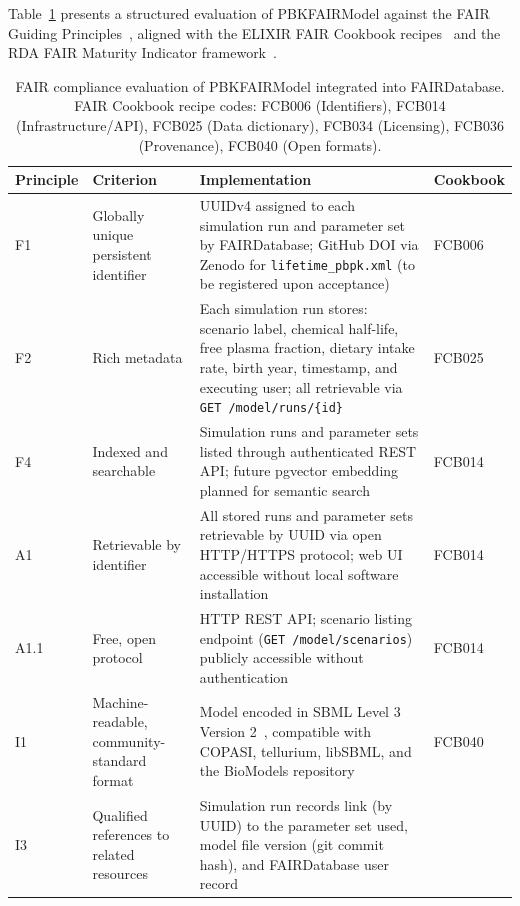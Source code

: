 \documentclass[preprint,12pt]{elsarticle}
\begin{document}
\begin{linenumbers}
Table~\ref{tab:fair_eval} presents a structured evaluation of PBKFAIRModel
against the FAIR Guiding Principles~\cite{wilkinson2016}, aligned with
the ELIXIR FAIR Cookbook recipes~\cite{faircookbook2024} and the RDA
FAIR Maturity Indicator framework~\cite{rda_fair2020}.

\begin{table}[h]
\centering
\caption{FAIR compliance evaluation of PBKFAIRModel integrated into FAIRDatabase.
  FAIR Cookbook recipe codes: FCB006 (Identifiers), FCB014 (Infrastructure/API),
  FCB025 (Data dictionary), FCB034 (Licensing), FCB036 (Provenance),
  FCB040 (Open formats).}
\label{tab:fair_eval}
\small
\begin{tabular}{p{1.0cm} p{2.6cm} p{5.8cm} p{2.4cm}}
\toprule
\textbf{Principle} & \textbf{Criterion} & \textbf{Implementation} &
\textbf{Cookbook} \\
\midrule
F1 & Globally unique persistent identifier
   & UUIDv4 assigned to each simulation run and parameter set by
     FAIRDatabase; GitHub DOI via Zenodo for \texttt{lifetime\_pbpk.xml}
     (to be registered upon acceptance)
   & FCB006 \\[4pt]
F2 & Rich metadata
   & Each simulation run stores: scenario label, chemical half-life,
     free plasma fraction, dietary intake rate, birth year, timestamp,
     and executing user; all retrievable via \texttt{GET /model/runs/\{id\}}
   & FCB025 \\[4pt]
F4 & Indexed and searchable
   & Simulation runs and parameter sets listed through authenticated
     REST API; future pgvector embedding planned for semantic search
   & FCB014 \\[4pt]
A1 & Retrievable by identifier
   & All stored runs and parameter sets retrievable by UUID via
     open HTTP/HTTPS protocol; web UI accessible without local
     software installation
   & FCB014 \\[4pt]
A1.1 & Free, open protocol
   & HTTP REST API; scenario listing endpoint (\texttt{GET /model/scenarios})
     publicly accessible without authentication
   & FCB014 \\[4pt]
I1 & Machine-readable, community-standard format
   & Model encoded in SBML Level 3 Version 2~\cite{hucka2003},
     compatible with COPASI, tellurium, libSBML, and the BioModels
     repository
   & FCB040 \\[4pt]
I3 & Qualified references to related resources
   & Simulation run records link (by UUID) to the parameter set used,
     model file version (git commit hash), and FAIRDatabase user record

\end{tabular}
\end{table}
\end{linenumbers}
\end{document}
